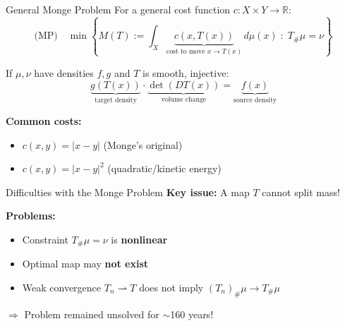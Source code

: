 \documentclass[aspectratio=169]{beamer}
\newcommand{\R}{\mathbb{R}}
\begin{document}
\begin{frame}{General Monge Problem}
For a general cost function $c: X \times Y \to \R$:
\[
\text{(MP)} \quad \min \left\{ M(T) := \int_X \underbrace{c(x, T(x))}_{\text{cost to move } x \to T(x)} \, d\mu(x) \;:\; T_\#\mu = \nu \right\}
\]

\vspace{0.3cm}
If $\mu, \nu$ have densities $f, g$ and $T$ is smooth, injective:
\[
\underbrace{g(T(x))}_{\text{target density}} \cdot \underbrace{\det(DT(x))}_{\text{volume change}} = \underbrace{f(x)}_{\text{source density}}
\]

\vspace{0.3cm}
\textbf{Common costs:}
\begin{itemize}
    \item $c(x,y) = |x-y|$ \quad (Monge's original)
    \item $c(x,y) = |x-y|^2$ \quad (quadratic/kinetic energy)
\end{itemize}
\end{frame}

\begin{frame}{Difficulties with the Monge Problem}
\textbf{Key issue:} A map $T$ cannot split mass!

\vspace{0.3cm}
\begin{center}
\end{center}

\vspace{0.2cm}
\textbf{Problems:}
\begin{itemize}
    \item Constraint $T_\#\mu = \nu$ is \textbf{nonlinear}
    \item Optimal map may \textbf{not exist}
    \item Weak convergence $T_n \rightharpoonup T$ does not imply $(T_n)_\#\mu \to T_\#\mu$
\end{itemize}

\vspace{0.2cm}
$\Rightarrow$ Problem remained unsolved for $\sim$160 years!
\end{frame}
\end{document}
